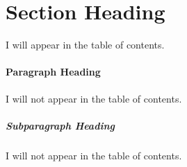 \documentclass[
DToption=dissertation,%
wsudraft,
]{wsu}
\begin{document}
\section{Section Heading}
I will appear in the table of contents.

















\paragraph{Paragraph Heading}
I will not appear in the table of contents.
\lipsum[1]

\subparagraph{Subparagraph Heading}
I will not appear in the table of contents.
\lipsum[1]
\end{document}
